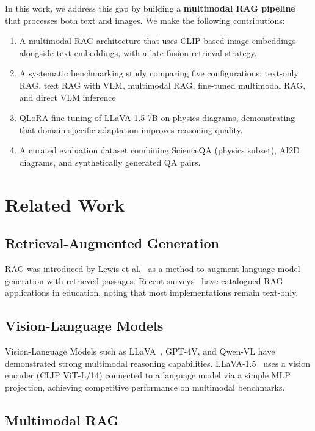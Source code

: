 \documentclass[conference]{IEEEtran}
\begin{document}
In this work, we address this gap by building a \textbf{multimodal RAG pipeline} that processes both text and images.
We make the following contributions:

\begin{enumerate}
    \item A multimodal RAG architecture that uses CLIP-based image embeddings alongside text embeddings, with a late-fusion retrieval strategy.
    \item A systematic benchmarking study comparing five configurations: text-only RAG, text RAG with VLM, multimodal RAG, fine-tuned multimodal RAG, and direct VLM inference.
    \item QLoRA fine-tuning of LLaVA-1.5-7B on physics diagrams, demonstrating that domain-specific adaptation improves reasoning quality.
    \item A curated evaluation dataset combining ScienceQA (physics subset), AI2D diagrams, and synthetically generated QA pairs.
\end{enumerate}

\section{Related Work}
\label{sec:related}

\subsection{Retrieval-Augmented Generation}

RAG was introduced by Lewis et al.~\cite{lewis2020rag} as a method to augment language model generation with retrieved passages.
Recent surveys~\cite{rag_education_2025} have catalogued RAG applications in education, noting that most implementations remain text-only.

\subsection{Vision-Language Models}

Vision-Language Models such as LLaVA~\cite{liu2023llava}, GPT-4V, and Qwen-VL have demonstrated strong multimodal reasoning capabilities.
LLaVA-1.5~\cite{liu2023improvedllava} uses a vision encoder (CLIP ViT-L/14) connected to a language model via a simple MLP projection, achieving competitive performance on multimodal benchmarks.

\subsection{Multimodal RAG}
\end{document}
